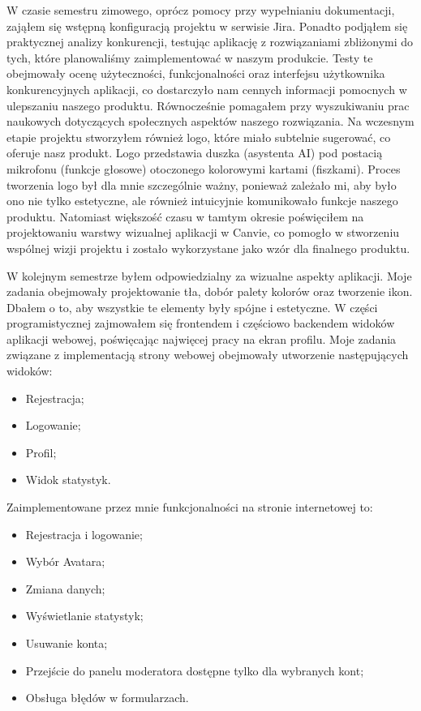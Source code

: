W czasie semestru zimowego, oprócz pomocy przy wypełnianiu dokumentacji, zająłem się wstępną konfiguracją projektu w
serwisie Jira. Ponadto podjąłem się praktycznej analizy konkurencji, testując aplikację z rozwiązaniami zbliżonymi do
tych, które planowaliśmy zaimplementować w naszym produkcie. Testy te obejmowały ocenę użyteczności, funkcjonalności oraz
interfejsu użytkownika konkurencyjnych aplikacji, co dostarczyło nam cennych informacji pomocnych w ulepszaniu naszego
produktu. Równocześnie pomagałem przy wyszukiwaniu prac naukowych dotyczących społecznych aspektów naszego rozwiązania.
Na wczesnym etapie projektu stworzyłem również logo, które miało subtelnie sugerować, co oferuje nasz produkt.
Logo przedstawia duszka (asystenta AI) pod postacią mikrofonu (funkcje głosowe) otoczonego kolorowymi kartami (fiszkami).
Proces tworzenia logo był dla mnie szczególnie ważny, ponieważ zależało mi, aby było ono nie tylko estetyczne,
ale również intuicyjnie komunikowało funkcje naszego produktu. Natomiast większość czasu w tamtym okresie poświęciłem
na projektowaniu warstwy wizualnej aplikacji w Canvie, co pomogło w stworzeniu wspólnej wizji projektu i zostało
wykorzystane jako wzór dla finalnego produktu.
\par W kolejnym semestrze byłem odpowiedzialny za wizualne aspekty aplikacji. Moje zadania obejmowały projektowanie
tła, dobór palety kolorów oraz tworzenie ikon. Dbałem o to, aby wszystkie te elementy były spójne i estetyczne.
W części programistycznej zajmowałem się frontendem i częściowo backendem widoków aplikacji webowej, poświęcając
najwięcej pracy na ekran profilu. Moje zadania związane z implementacją strony webowej obejmowały utworzenie
następujących widoków:

\begin{itemize}
    \item Rejestracja;
    \item Logowanie;
    \item Profil;
    \item Widok statystyk.
\end{itemize}

Zaimplementowane przez mnie funkcjonalności na stronie internetowej to:

\begin{itemize}
    \item Rejestracja i logowanie;
    \item Wybór Avatara;
    \item Zmiana danych;
    \item Wyświetlanie statystyk;
    \item Usuwanie konta;
    \item Przejście do panelu moderatora dostępne tylko dla wybranych kont;
    \item Obsługa błędów w formularzach.
\end{itemize}

